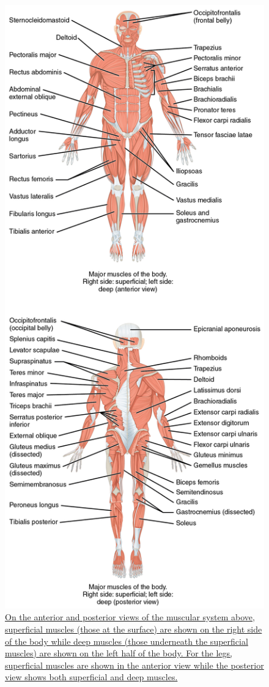 \begin{figure}

{\centering \includegraphics[width=0.7\linewidth]{./figures/locomotion/1105_Anterior_and_Posterior_Views_of_Muscles} 

}

\caption{\href{https://commons.wikimedia.org/wiki/File:1105_Anterior_and_Posterior_Views_of_Muscles.jpg}{On the anterior and posterior views of the muscular system above, superficial muscles (those at the surface) are shown on the right side of the body while deep muscles (those underneath the superficial muscles) are shown on the left half of the body. For the legs, superficial muscles are shown in the anterior view while the posterior view shows both superficial and deep muscles.}}\label{fig:muscularsystem}
\end{figure}

